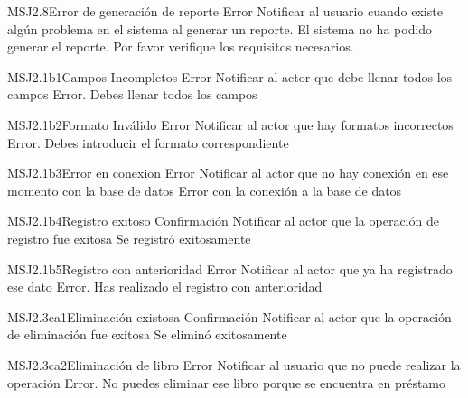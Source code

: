 \begin{Message}{MSJ2.8}{Error de generación de reporte}
	\MSGitem[Tipo:] Error
	\MSGitem[Objetivo: ] Notificar al usuario cuando existe algún problema en el sistema al generar un reporte.
	\MSGitem[Redacción: ] El sistema no ha podido generar el reporte. Por favor verifique los requisitos necesarios.
\end{Message}


\begin{Message}{MSJ2.1b1}{Campos Incompletos}
		\MSGitem[Tipo:] Error	
		\MSGitem[Objetivo: ] Notificar al actor que debe llenar todos los campos
		\MSGitem[Redacción: ] Error. Debes llenar todos los campos
	\end{Message}
	
	\begin{Message}{MSJ2.1b2}{Formato Inválido}
		\MSGitem[Tipo:] Error	
		\MSGitem[Objetivo: ] Notificar al actor que hay formatos incorrectos
		\MSGitem[Redacción: ] Error. Debes introducir el formato correspondiente
	\end{Message}
	
	\begin{Message}{MSJ2.1b3}{Error en conexion}
		\MSGitem[Tipo:] Error	
		\MSGitem[Objetivo: ] Notificar al actor que no hay conexión en ese momento con la base de datos
		\MSGitem[Redacción: ] Error con la conexión a la base de datos
	\end{Message}
	
	\begin{Message}{MSJ2.1b4}{Registro exitoso}
		\MSGitem[Tipo:] Confirmación	
		\MSGitem[Objetivo: ] Notificar al actor que la operación de registro fue exitosa
		\MSGitem[Redacción: ] Se registró exitosamente
	\end{Message}
	
	\begin{Message}{MSJ2.1b5}{Registro con anterioridad}
		\MSGitem[Tipo:] Error	
		\MSGitem[Objetivo: ] Notificar al actor que ya ha registrado ese dato
		\MSGitem[Redacción: ] Error. Has realizado el registro con anterioridad
	\end{Message}
	
	\begin{Message}{MSJ2.3ca1}{Eliminación existosa}
		\MSGitem[Tipo:] Confirmación	
		\MSGitem[Objetivo: ] Notificar al actor que la operación de eliminación fue exitosa
		\MSGitem[Redacción: ] Se eliminó exitosamente
	\end{Message}
	
	\begin{Message}{MSJ2.3ca2}{Eliminación de libro}
		\MSGitem[Tipo:] Error	
		\MSGitem[Objetivo: ] Notificar al usuario que no puede realizar la operación
		\MSGitem[Redacción: ] Error. No puedes eliminar ese libro porque se encuentra en préstamo
	\end{Message}
	
